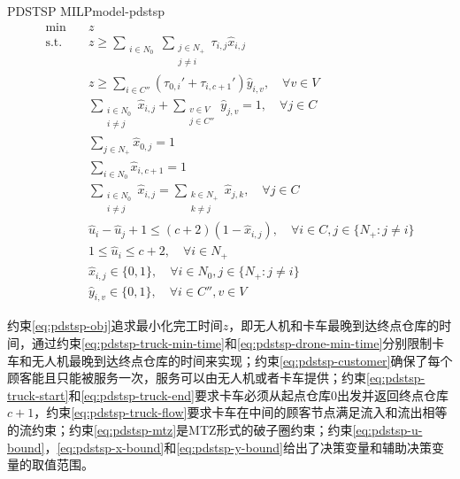 {
\newcommand{\mySubstack}[1]{\mathclap{\substack{#1}}}

\begin{model}{PDSTSP MILP}{model-pdstsp}
\begin{align}
    \min \quad & z \label{eq:pdstsp-obj}\\
    \text{s.t.} \quad & z \geq \sum_{\substack{i \in N_0}} \sum_{\substack{j \in N_{+}\\ j\neq i}}\tau_{i,j}\hat{x}_{i,j} \label{eq:pdstsp-truck-min-time}\\
    \quad & z \geq \sum_{i \in C''}(\tau_{0,i}' + \tau_{i, c+1}')\hat{y}_{i,v},\quad \forall v \in V\label{eq:pdstsp-drone-min-time}\\
    \quad & \sum_{\substack{i \in N_0\\ i\neq j}}\hat{x}_{i,j} + \sum_{\substack{v \in V\\ j \in C''}}\hat{y}_{j,v} = 1, \quad \forall j \in C\label{eq:pdstsp-customer}\\
    \quad & \sum_{j \in N_{+}}\hat{x}_{0,j} = 1\label{eq:pdstsp-truck-start}\\
    \quad & \sum_{i \in N_0}\hat{x}_{i,c+1} = 1\label{eq:pdstsp-truck-end}\\
    \quad & \sum_{\substack{i \in N_0\\i \neq j}}\hat{x}_{i,j} = \sum_{\substack{k \in N_{+}\\ k\neq j}}\hat{x}_{j,k}, \quad \forall j \in C\label{eq:pdstsp-truck-flow}\\
    \quad & \hat{u}_i - \hat{u}_j + 1 \leq (c+2)(1 - \hat{x}_{i,j}), \quad \forall i \in C, j \in \{N_{+}:j \neq i\}\label{eq:pdstsp-mtz}\\
    \quad & 1 \leq \hat{u}_i \leq c+2, \quad \forall i \in N_{+}\label{eq:pdstsp-u-bound}\\
    \quad & \hat{x}_{i,j} \in \{0,1\},\quad \forall i \in N_0, j \in \{N_{+}: j\neq i\}\label{eq:pdstsp-x-bound}\\
    \quad & \hat{y}_{i,v} \in \{0,1\},\quad \forall i \in C'', v \in V\label{eq:pdstsp-y-bound}
\end{align}
\end{model}
}

约束\ref{eq:pdstsp-obj}追求最小化完工时间$z$，即无人机和卡车最晚到达终点仓库的时间，通过约束\ref{eq:pdstsp-truck-min-time}和\ref{eq:pdstsp-drone-min-time}分别限制卡车和无人机最晚到达终点仓库的时间来实现；约束\ref{eq:pdstsp-customer}确保了每个顾客能且只能被服务一次，服务可以由无人机或者卡车提供；约束\ref{eq:pdstsp-truck-start}和\ref{eq:pdstsp-truck-end}要求卡车必须从起点仓库$0$出发并返回终点仓库$c+1$，约束\ref{eq:pdstsp-truck-flow}要求卡车在中间的顾客节点满足流入和流出相等的流约束；约束\ref{eq:pdstsp-mtz}是MTZ形式的破子圈约束；约束\ref{eq:pdstsp-u-bound}，\ref{eq:pdstsp-x-bound}和\ref{eq:pdstsp-y-bound}给出了决策变量和辅助决策变量的取值范围。
